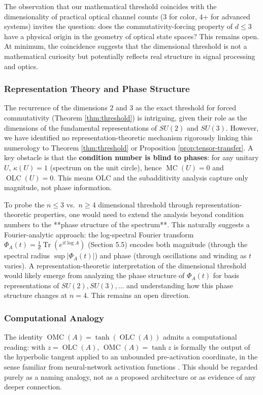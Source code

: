 \documentclass{article}
\theoremstyle{remark}
\providecommand{\QLC}{\operatorname{OLC}}
\providecommand{\QMC}{\operatorname{OMC}}
\providecommand{\MC}{\operatorname{MC}}
\begin{document}
The observation that our mathematical threshold coincides with the dimensionality of practical optical channel counts (3 for color, 4+ for advanced systems) invites the question: does the commutativity-forcing property of $d\le3$ have a physical origin in the geometry of optical state spaces? This remains open. At minimum, the coincidence suggests that the dimensional threshold is not a mathematical curiosity but potentially reflects real structure in signal processing and optics.

\subsubsection{Representation Theory and Phase Structure}

The recurrence of the dimensions $2$ and $3$ as the exact threshold for forced commutativity (Theorem \ref{thm:threshold}) is intriguing, given their role as the dimensions of the fundamental representations of $SU(2)$ and $SU(3)$. However, we have identified no representation-theoretic mechanism rigorously linking this numerology to Theorem \ref{thm:threshold} or Proposition \ref{prop:tensor-transfer}. A key obstacle is that the \textbf{condition number is blind to phases}: for any unitary $U$, $\kappa(U)=1$ (spectrum on the unit circle), hence $\MC(U)=0$ and $\QLC(U)=0$. This means OLC and the subadditivity analysis capture only magnitude, not phase information. 

To probe the $n\le3$ vs.\ $n\ge4$ dimensional threshold through representation-theoretic properties, one would need to extend the analysis beyond condition numbers to the **phase structure of the spectrum**. This naturally suggests a Fourier-analytic approach: the log-spectral Fourier transform $\Phi_A(t)=\frac1d\operatorname{Tr}(e^{it\log A})$ (Section 5.5) encodes both magnitude (through the spectral radius $\sup|\Phi_A(t)|$) and phase (through oscillations and winding as $t$ varies). A representation-theoretic interpretation of the dimensional threshold would likely emerge from analyzing the phase structure of $\Phi_A(t)$ for basis representations of $SU(2), SU(3),\ldots$ and understanding how this phase structure changes at $n=4$. This remains an open direction.

\subsubsection{Computational Analogy}

The identity $\QMC(A)=\tanh(\QLC(A))$ admits a computational reading: with $z=\QLC(A)$, $\QMC(A)=\tanh z$ is formally the output of the hyperbolic tangent applied to an unbounded pre-activation coordinate, in the sense familiar from neural-network activation functions \cite{goodfellow2016}. This should be regarded purely as a naming analogy, not as a proposed architecture or as evidence of any deeper connection.
\end{document}
